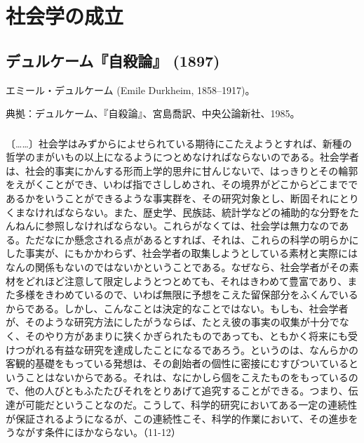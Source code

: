 
\chapter{社会学の成立}

\section{デュルケーム『自殺論』 (1897)}




エミール・デュルケーム (Emile Durkheim, 1858--1917)。


典拠：デュルケーム、『自殺論』、宮島喬訳、中央公論新社、1985。

\subsection{}



〔……〕社会学はみずからによせられている期待にこたえようとすれば、新種の哲学のまがいもの以上になるようにつとめなければならないのである。社会学者は、社会的事実にかんする形而上学的思弁に甘んじないで、はっきりとその輪郭をえがくことができ、いわば指でさししめされ、その境界がどこからどこまでであるかをいうことができるような事実群を、その研究対象とし、断固それにとりくまなければならない。また、歴史学、民族誌、統計学などの補助的な分野をたんねんに参照しなければならない。これらがなくては、社会学は無力なのである。ただなにか懸念される点があるとすれば、それは、これらの科学の明らかにした事実が、にもかかわらず、社会学者の取集しようとしている素材と実際にはなんの関係もないのではないかということである。なぜなら、社会学者がその素材をどれほど注意して限定しようとつとめても、それはきわめて豊富であり、また多様をきわめているので、いわば無限に予想をこえた留保部分をふくんでいるからである。しかし、こんなことは決定的なことではない。もしも、社会学者が、そのような研究方法にしたがうならば、たとえ彼の事実の収集が十分でなく、そのやり方があまりに狭くかぎられたものであっても、ともかく将来にも受けつがれる有益な研究を達成したことになるであろう。というのは、なんらかの客観的基礎をもっている発想は、その創始者の個性に密接にむすびついているということはないからである。それは、なにかしら個をこえたものをもっているので、他の人びともふたたびそれをとりあげて追究することができる。つまり、伝達が可能だということなのだ。こうして、科学的研究においてある一定の連続性が保証されるようになるが、この連続性こそ、科学的作業において、その進歩をうながす条件にほかならない。（11-12）


\subsection{}




